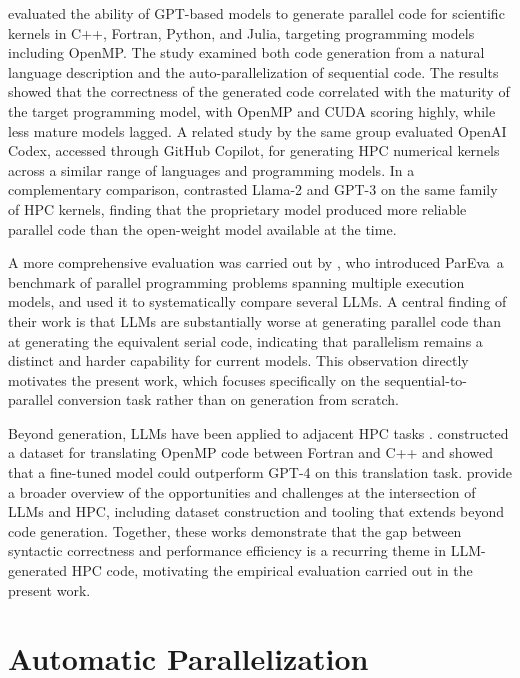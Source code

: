  evaluated the ability of GPT-based models to generate parallel code for scientific kernels in C++, Fortran, Python, and Julia, targeting programming models including OpenMP. The study examined both code generation from a natural language description and the auto-parallelization of sequential code. The results showed that the correctness of the generated code correlated with the maturity of the target programming model, with OpenMP and CUDA scoring highly, while less mature models lagged. A related study by the same group  evaluated OpenAI Codex, accessed through GitHub Copilot, for generating HPC numerical kernels across a similar range of languages and programming models. In a complementary comparison,  contrasted Llama-2 and GPT-3 on the same family of HPC kernels, finding that the proprietary model produced more reliable parallel code than the open-weight model available at the time.

A more comprehensive evaluation was carried out by , who introduced ParEva\, a benchmark of parallel programming problems spanning multiple execution models, and used it to systematically compare several LLMs. A central finding of their work is that LLMs are substantially worse at generating parallel code than at generating the equivalent serial code, indicating that parallelism remains a distinct and harder capability for current models. This observation directly motivates the present work, which focuses specifically on the sequential-to-parallel conversion task rather than on generation from scratch.

Beyond generation, LLMs have been applied to adjacent HPC tasks \cite{lei2023dataset}. constructed a dataset for translating OpenMP code between Fortran and C++ and showed that a fine-tuned model could outperform GPT-4 on this translation task. 
 provide a broader overview of the opportunities and challenges at the intersection of LLMs and HPC, including dataset construction and tooling that extends beyond code generation. Together, these works demonstrate that the gap between syntactic correctness and performance efficiency is a recurring theme in LLM-generated HPC code, motivating the empirical evaluation carried out in the present work.

\section{Automatic Parallelization}
\label{sec:rw_auto}

